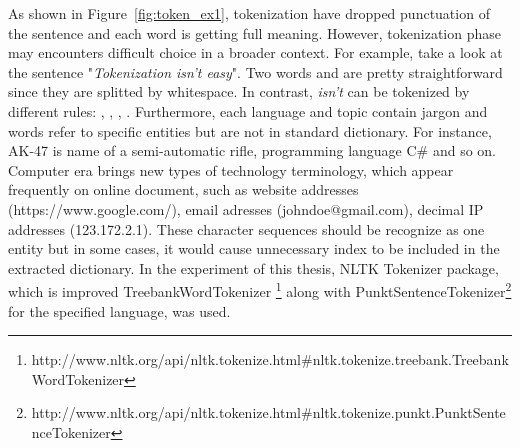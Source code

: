 As shown in Figure~\ref{fig:token_ex1}, tokenization have dropped punctuation of the sentence and each word is getting full meaning. However, tokenization phase may encounters difficult choice in a broader context. For example, take a look at the sentence "\textit{Tokenization isn't easy}". Two words  and  are pretty straightforward since they are splitted by whitespace. In contrast, \textit{isn't} can be tokenized by different rules: , ,  ,  . Furthermore, each language and topic contain jargon and words refer to specific entities but are not in standard dictionary. For instance, AK-47 is name of a semi-automatic rifle, programming language C\# and so on. Computer era brings new types of technology terminology, which appear frequently on online document, such as website addresses (https://www.google.com/), email adresses (johndoe@gmail.com), decimal IP addresses (123.172.2.1). These character sequences should be recognize as one entity but in some cases, it would cause unnecessary index to be included in the extracted dictionary. In the experiment of this thesis, NLTK Tokenizer package, which is improved TreebankWordTokenizer \footnote{http://www.nltk.org/api/nltk.tokenize.html\#nltk.tokenize.treebank.TreebankWordTokenizer} along with PunktSentenceTokenizer\footnote{http://www.nltk.org/api/nltk.tokenize.html\#nltk.tokenize.punkt.PunktSentenceTokenizer} for the specified language, was used.

